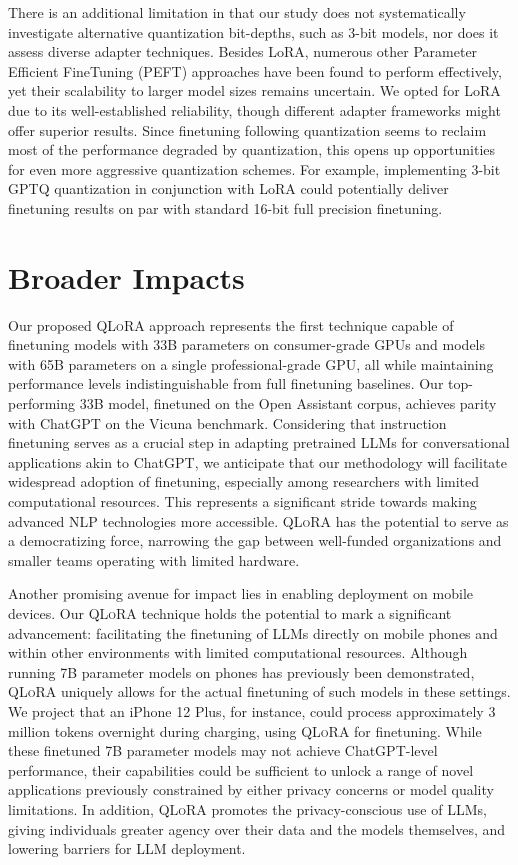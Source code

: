 There is an additional limitation in that our study does not systematically investigate alternative quantization bit-depths, such as 3-bit models, nor does it assess diverse adapter techniques. Besides LoRA, numerous other Parameter Efficient FineTuning (PEFT) approaches have been found to perform effectively, yet their scalability to larger model sizes remains uncertain. We opted for LoRA due to its well-established reliability, though different adapter frameworks might offer superior results. Since finetuning following quantization seems to reclaim most of the performance degraded by quantization, this opens up opportunities for even more aggressive quantization schemes. For example, implementing 3-bit GPTQ quantization in conjunction with LoRA could potentially deliver finetuning results on par with standard 16-bit full precision finetuning.

\section{Broader Impacts}

Our proposed \textsc{QLoRA} approach represents the first technique capable of finetuning models with 33B parameters on consumer-grade GPUs and models with 65B parameters on a single professional-grade GPU, all while maintaining performance levels indistinguishable from full finetuning baselines. Our top-performing 33B model, finetuned on the Open Assistant corpus, achieves parity with ChatGPT on the Vicuna benchmark. Considering that instruction finetuning serves as a crucial step in adapting pretrained LLMs for conversational applications akin to ChatGPT, we anticipate that our methodology will facilitate widespread adoption of finetuning, especially among researchers with limited computational resources. This represents a significant stride towards making advanced NLP technologies more accessible. \textsc{QLoRA} has the potential to serve as a democratizing force, narrowing the gap between well-funded organizations and smaller teams operating with limited hardware.

Another promising avenue for impact lies in enabling deployment on mobile devices. Our \textsc{QLoRA} technique holds the potential to mark a significant advancement: facilitating the finetuning of LLMs directly on mobile phones and within other environments with limited computational resources. Although running 7B parameter models on phones has previously been demonstrated, \textsc{QLoRA} uniquely allows for the actual finetuning of such models in these settings. We project that an iPhone 12 Plus, for instance, could process approximately 3 million tokens overnight during charging, using \textsc{QLoRA} for finetuning. While these finetuned 7B parameter models may not achieve ChatGPT-level performance, their capabilities could be sufficient to unlock a range of novel applications previously constrained by either privacy concerns or model quality limitations. In addition, \textsc{QLoRA} promotes the privacy-conscious use of LLMs, giving individuals greater agency over their data and the models themselves, and lowering barriers for LLM deployment.

